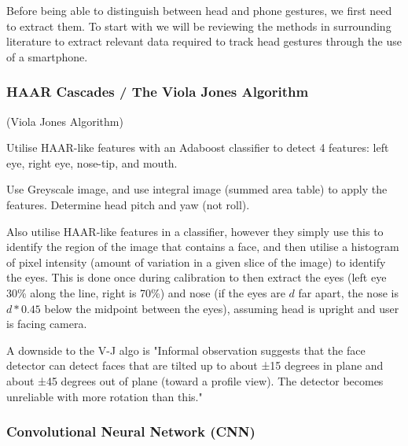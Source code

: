 Before being able to distinguish between head and phone gestures, we first need to extract them. To start with we will be reviewing the methods in surrounding literature to extract relevant data required to track head gestures through the use of a smartphone.


\subsubsection{HAAR Cascades / The Viola Jones Algorithm}\nl
(Viola Jones Algorithm\cite{viola2004robust})

\cite{kim2017real} Utilise HAAR-like features with an Adaboost classifier to detect 4 features: left eye, right eye, nose-tip, and mouth.

Use Greyscale image, and use integral image (summed area table) to apply the features.
Determine head pitch and yaw (not roll).

\cite{neto2012real} Also utilise HAAR-like features in a classifier, however they simply use this to identify the region of the image that contains a face, and then utilise a histogram of pixel intensity (amount of variation in a given slice of the image) to identify the eyes.
This is done once during calibration to then extract the eyes (left eye 30\% along the line, right is 70\%) and nose (if the eyes are $d$ far apart, the nose is $d*0.45$ below the midpoint between the eyes), assuming head is upright and user is facing camera.

A downside to the V-J algo is "Informal observation suggests that the face detector can detect faces that are tilted up to about ±15 degrees in plane and about ±45 degrees out of plane (toward a profile view). The detector becomes unreliable with more rotation than this."\cite{viola2004robust}


\subsubsection{Convolutional Neural Network (CNN)}\nl

